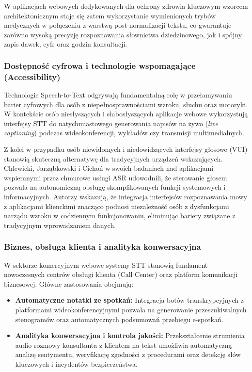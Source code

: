 W aplikacjach webowych dedykowanych dla ochrony zdrowia kluczowym wzorcem architektonicznym staje się zatem wykorzystanie wymienionych trybów medycznych w połączeniu z warstwą post-normalizacji tekstu, co gwarantuje zarówno wysoką precyzję rozpoznawania słownictwa dziedzinowego, jak i spójny zapis dawek, cyfr oraz godzin konsultacji.


\subsubsection{Dostępność cyfrowa i technologie wspomagające (Accessibility)}

Technologie Speech-to-Text odgrywają fundamentalną rolę w przełamywaniu barier cyfrowych dla osób z niepełnosprawnościami wzroku, słuchu oraz motoryki. W kontekście osób niesłyszących i słabosłyszących aplikacje webowe wykorzystują interfejsy STT do natychmiastowego generowania napisów na żywo (\textit{live captioning}) podczas wideokonferencji, wykładów czy transmisji multimedialnych.


Z kolei w przypadku osób niewidomych i niedowidzących interfejsy głosowe (VUI) stanowią skuteczną alternatywę dla tradycyjnych urządzeń wskazujących. Chlewicki, Jarząbkowski i Cichoń \cite[s.~318]{chlewicki2024potencjal} w swoich badaniach nad aplikacjami wspieranymi przez chmurowe usługi ASR udowodnili, że sterowanie głosem pozwala na autonomiczną obsługę skomplikowanych funkcji systemowych i informacyjnych. Autorzy wskazują, że integracja interfejsów rozpoznawania mowy z aplikacjami klienckimi znacząco podnosi niezależność osób z dysfunkcjami narządu wzroku w codziennym funkcjonowaniu, eliminując bariery związane z tradycyjnym wprowadzaniem danych.

\subsubsection{Biznes, obsługa klienta i analityka konwersacyjna}

W sektorze komercyjnym webowe systemy STT stanowią fundament nowoczesnych centrów obsługi klienta (Call Center) oraz platform komunikacji biznesowej. Główne zastosowania obejmują:
\begin{itemize}
    \item \textbf{Automatyczne notatki ze spotkań:} Integracja botów transkrypcyjnych z platformami wideokonferencyjnymi pozwala na generowanie przeszukiwalnych stenogramów oraz automatycznych podsumowań przebiegu e-spotkań.
    \item \textbf{Analityka konwersacyjna i kontrola jakości:} Przekształcenie strumienia audio rozmowy konsultanta z klientem na tekst umożliwia automatyczną analizę sentymentu, weryfikację zgodności z procedurami oraz detekcję słów kluczowych i incydentów bezpieczeństwa.
\end{itemize}

